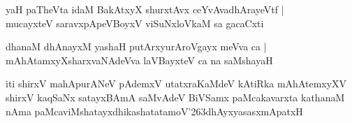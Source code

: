 \documentclass[twoside,12pt,openright]{book}
\def\S{\char'263}
\newcounter{shloka}[chapter]
\begin{document}
\begin{shloka}%
yaH paTheVta idaM BakAtxyX shurxtAvx ceYvAvadhArayeVtf |\\
mucayxteV saravxpApeVBoyxV viSuNxloVkaM sa gacaCxti
\end{shloka}

\begin{shloka}%
dhanaM dhAnayxM yashaH putArxyurAroVgayx meVva ca |\\
mAhAtamxyXsharxvaNAdeVva laVBayxteV ca na saMshayaH 
\end{shloka}

\begin{center}
iti shirxV mahApurANeV pAdemxV utatxraKaMdeV kAtiRka mAhAtemxyXV  shirxV kaqSaNx satayxBAmA 
saMvAdeV BiVSamx paMcakavarxta kathanaM nAma paMcaviMshatayxdhikashatatamoV\S dhAyxyasasxmApatxH 
\end{center}
\end{document}
